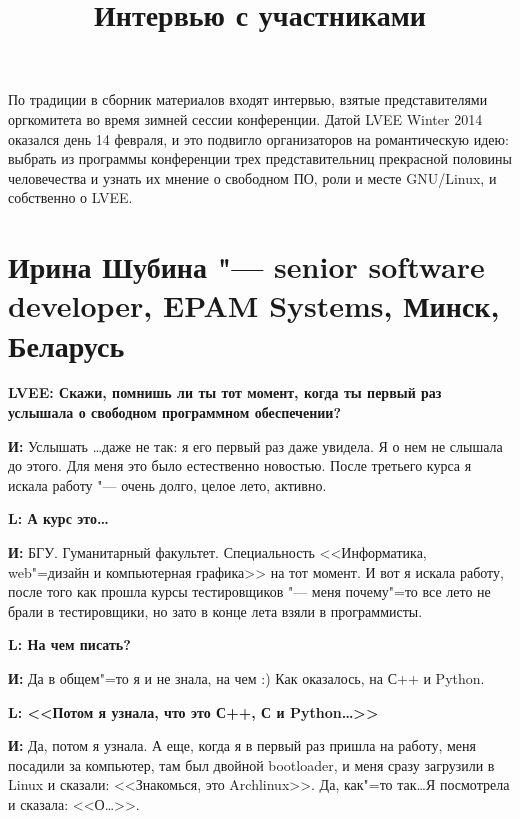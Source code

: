 \documentclass[10pt, a5paper]{article}
\begin{document}
\title{Интервью с участниками}
\date{}
\maketitle

По традиции в сборник материалов входят интервью, взятые представителями оргкомитета во время зимней сессии конференции. Датой LVEE Winter 2014 оказался день 14 февраля, и это подвигло организаторов на романтическую идею: выбрать из программы конференции трех представительниц прекрасной половины человечества и узнать их мнение о свободном ПО, роли и месте GNU/Linux, и собственно о LVEE.

\section[Ирина Шубина "--- senior software developer, EPAM Systems, Минск, Беларусь]{Ирина Шубина "--- senior software \linebreak developer, EPAM Systems, Минск, Беларусь}

{\noindent \bf LVEE: Скажи, помнишь ли ты тот момент, когда ты первый раз услышала о свободном программном обеспечении?}

{\noindent \bf И:} Услышать \ldots даже не так: я его первый раз даже увидела. Я о нем не слышала до этого. Для меня это было естественно новостью. После третьего курса я искала работу "--- очень долго, целое лето, активно.

{\noindent \bf L: А курс это\ldots}

{\noindent \bf И:} БГУ. Гуманитарный факультет. Специальность <<Информатика, web"=дизайн и компьютерная графика>> на тот момент.  И вот я искала работу, после того как прошла курсы тестировщиков "--- меня почему"=то все лето не брали в тестировщики, но зато в конце лета взяли в программисты.

{\noindent \bf L: На чем писать?}

{\noindent \bf И:} Да в общем"=то я и не знала, на чем :) Как оказалось, на С++ и Python.

{\noindent \bf L: <<Потом я узнала, что это С++, С и Python\ldots>>}

{\noindent \bf И:} Да, потом я узнала. А еще, когда я в первый раз пришла на работу, меня посадили за компьютер, там был двойной bootloader, и меня сразу загрузили в Linux и сказали: <<Знакомься, это Archlinux>>. Да, как"=то так\ldots Я посмотрела и сказала: <<О\ldots >>.
\end{document}
